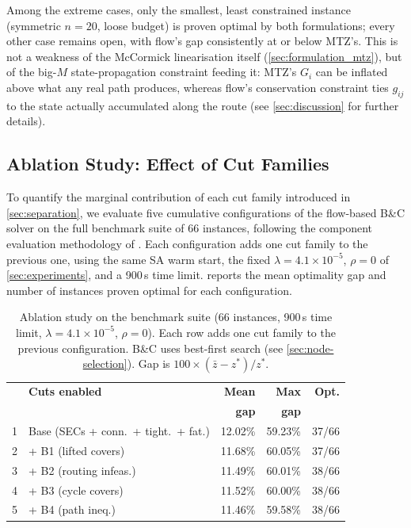 \documentclass[11pt,a4paper]{article}
\begin{document}
Among the extreme cases, only the smallest, least constrained instance (symmetric $n=20$, loose budget) is proven optimal by both formulations; every other case remains open, with flow's gap consistently at or below MTZ's. This is not a weakness of the McCormick linearisation itself (\cref{sec:formulation_mtz}), but of the big-$M$ state-propagation constraint feeding it: MTZ's $G_i$ can be inflated above what any real path produces, whereas flow's conservation constraint ties $g_{ij}$ to the state actually accumulated along the route (see \cref{sec:discussion} for further details).

\subsection{Ablation Study: Effect of Cut Families}
\label{sec:ablation}

To quantify the marginal contribution of each cut family introduced in \cref{sec:separation}, we evaluate five cumulative configurations of the flow-based B\&C solver on the full benchmark suite of 66 instances, following the component evaluation methodology of \citet{kobeaga2021revisited}.
Each configuration adds one cut family to the previous one, using the same SA warm start, the fixed $\lambda = 4.1\times10^{-5}$, $\rho = 0$ of \cref{sec:experiments}, and a 900\,s time limit.
 reports the mean optimality gap and number of instances proven optimal for each configuration.

\begin{table}[H]
\centering
\caption{Ablation study on the benchmark suite (66 instances, 900\,s time limit, $\lambda = 4.1\times10^{-5}$, $\rho = 0$). Each row adds one cut family to the previous configuration. B\&C uses best-first search (see \cref{sec:node-selection}). Gap is $100 \times (\bar{z} - z^*) / z^*$.}
\label{tab:ablation}
\small
\begin{tabular}{clrrr}
\toprule
 & \textbf{Cuts enabled} & \textbf{Mean} & \textbf{Max} & \textbf{Opt.} \\
 &  & \textbf{gap} & \textbf{gap} &  \\
\midrule
1 & Base (SECs + conn.\ + tight.\ + fat.)  & 12.02\% & 59.23\% & 37/66 \\
2 & + B1 (lifted covers)                    & 11.68\% & 60.05\% & 37/66 \\
3 & + B2 (routing infeas.)                  & 11.49\% & 60.01\% & 38/66 \\
4 & + B3 (cycle covers)                     & 11.52\% & 60.00\% & 38/66 \\
5 & + B4 (path ineq.)                       & 11.46\% & 59.58\% & 38/66 \\
\bottomrule
\end{tabular}
\end{table}
\end{document}
